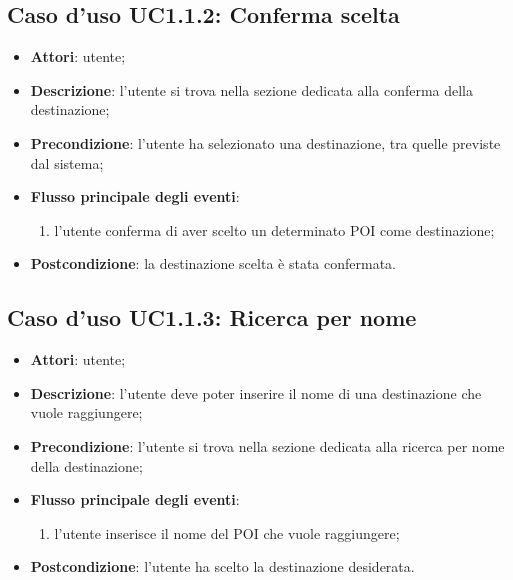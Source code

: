 \documentclass[../AnalisiDeiRequisiti.tex]{subfiles}
\begin{document}
\subsection{Caso d'uso UC1.1.2: Conferma scelta}
\begin{itemize}
\item \textbf{Attori}: utente;
\item \textbf{Descrizione}: l'utente si trova nella sezione dedicata alla conferma della destinazione; 
      \item \textbf{Precondizione}: l'utente ha selezionato una destinazione, tra quelle previste dal sistema;

        \item \textbf{Flusso principale degli eventi}:
          \begin{enumerate}
          \item l'utente conferma di aver scelto un determinato POI come destinazione;

      \end{enumerate}
    \item \textbf{Postcondizione}: la destinazione scelta è stata confermata.
  \end{itemize}
\hypertarget{UC1.1.3}{}
\subsection{Caso d'uso UC1.1.3: Ricerca per nome}
\begin{itemize}
\item \textbf{Attori}: utente;
\item \textbf{Descrizione}: l'utente deve poter inserire il nome di una destinazione che vuole raggiungere; 
      \item \textbf{Precondizione}: l'utente si trova nella sezione dedicata alla ricerca per nome della destinazione;

        \item \textbf{Flusso principale degli eventi}:
          \begin{enumerate}
          \item l'utente inserisce il nome del POI che vuole raggiungere;

      \end{enumerate}

    \item \textbf{Postcondizione}: l'utente ha scelto la destinazione desiderata.
  \end{itemize}
\hypertarget{UC1.1.4}{}
\end{document}
